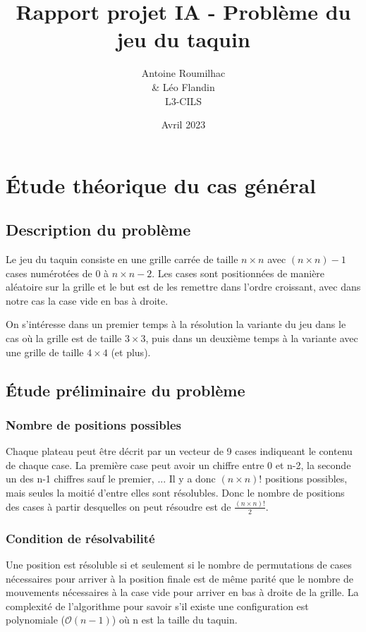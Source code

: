 \documentclass[a4paper, 12pt]{article}
\title{Rapport projet IA - Problème du jeu du taquin}
\author{Antoine Roumilhac\\
    \& Léo Flandin\\
    L3-CILS}
\date{Avril 2023}
\begin{document}
    \maketitle
    
    \section{Étude théorique du cas général}

    \subsection{Description du problème}
    Le jeu du taquin consiste en une grille carrée de taille $n\times n$ avec $(n\times n) - 1$ cases numérotées de 0 à $n \times n - 2$.
    Les cases sont positionnées de manière aléatoire sur la grille et le but est de les remettre dans l'ordre croissant, avec dans notre cas la case vide en bas à droite.
    
    
    On s'intéresse dans un premier temps à la résolution la variante du jeu dans le cas où la grille est de taille $3 \times 3$, puis dans un deuxième temps à la variante avec une grille de taille $4 \times 4$ (et plus).

    \subsection{Étude préliminaire du problème}
    
    \subsubsection{Nombre de positions possibles}
    Chaque plateau peut être décrit par un vecteur de 9 cases indiqueant le contenu de chaque case. La première case peut avoir un chiffre entre 0 et n-2, la seconde un des n-1 chiffres sauf le premier, ...
    Il y a donc $(n \times n)!$ positions possibles, mais seules la moitié d'entre elles sont résolubles.
    Donc le nombre de positions des cases à partir desquelles on peut résoudre est de $\frac{(n\times n)!}{2}$.
    
    \subsubsection{Condition de résolvabilité}
    Une position est résoluble si et seulement si le nombre de permutations de cases nécessaires pour arriver à la position finale est de même parité que le nombre de mouvements nécessaires à la case vide pour arriver en bas à droite de la grille.
    La complexité de l'algorithme pour savoir s'il existe une configuration est polynomiale ($\mathcal{O}(n-1)$) où n est la taille du taquin.
    
\end{document}
